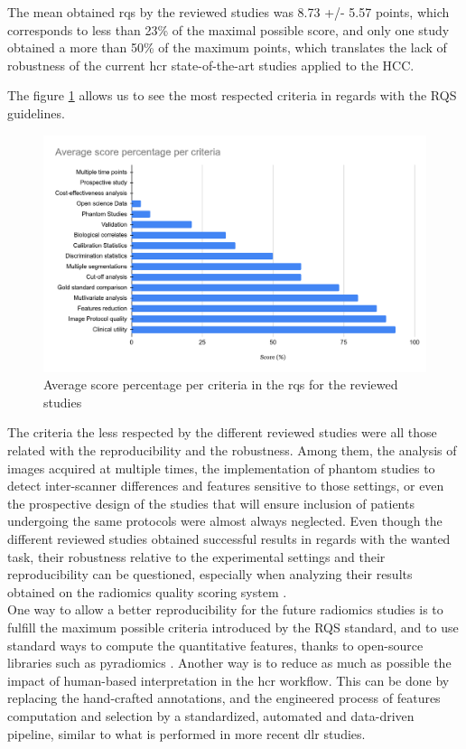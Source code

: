 

The mean obtained \ac{rqs} by the reviewed studies was 8.73 +/- 5.57
points, which corresponds to less than 23\% of the maximal possible
score, and only one study obtained a more than 50\% of the maximum
points, which translates the lack of robustness of the current
\ac{hcr} state-of-the-art studies applied to the HCC.

The figure \ref{RQS_points_per_criteria} allows us to see the most respected criteria in regards
with the RQS guidelines.


\begin{figure}[th!]
\centering
\includegraphics[width=0.7\linewidth]{images/image13}
\caption{Average score percentage per criteria in the \ac{rqs} for the reviewed studies}
\label{RQS_points_per_criteria}
\end{figure}


The criteria the less respected by the different reviewed studies were
all those related with the reproducibility and the robustness. Among
them, the analysis of images acquired at multiple times, the
implementation of phantom studies to detect inter-scanner differences
and features sensitive to those settings, or even the prospective design
of the studies that will ensure inclusion of patients undergoing the
same protocols were almost always neglected.
Even though the different reviewed studies obtained successful results
in regards with the wanted task, their robustness relative to the
experimental settings and their reproducibility can be questioned,
especially when analyzing their results obtained on the radiomics
quality scoring system \cite{Lambin2017}. \\
One way to allow a better reproducibility for the future radiomics
studies is to fulfill the maximum possible criteria introduced by the
RQS standard, and to use standard ways to compute the
quantitative features, thanks to open-source libraries such as
pyradiomics \cite{VanGriethuysen2017}. Another way is to reduce as much
as possible the impact of human-based interpretation in the \ac{hcr}
workflow. This can be done by replacing the hand-crafted annotations,
and the engineered process of features computation and selection by a
standardized, automated and data-driven pipeline, similar to what is
performed in more recent \ac{dlr} studies.

